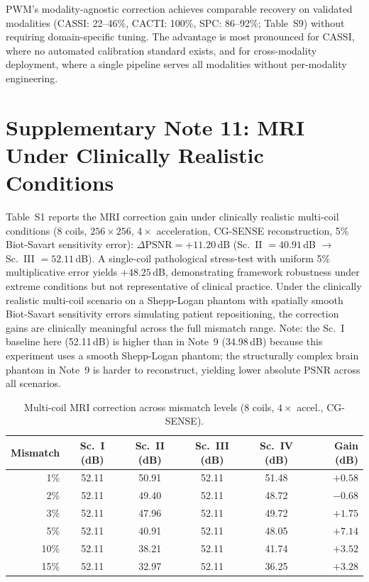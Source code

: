 \documentclass[11pt]{article}
\begin{document}
PWM's modality-agnostic correction achieves comparable recovery on validated modalities (CASSI: 22--46\%, CACTI: 100\%, SPC: 86--92\%; Table~S9) without requiring domain-specific tuning. The advantage is most pronounced for CASSI, where no automated calibration standard exists, and for cross-modality deployment, where a single pipeline serves all modalities without per-modality engineering.

\section{Supplementary Note 11: MRI Under Clinically Realistic Conditions}
\label{sec:mri_realistic}

Table~S1 reports the MRI correction gain under clinically realistic multi-coil conditions (8 coils, $256 \times 256$, $4\times$ acceleration, CG-SENSE reconstruction, 5\% Biot-Savart sensitivity error): $\Delta\mathrm{PSNR} = +11.20$\,dB (Sc.~II $= 40.91$\,dB $\to$ Sc.~III $= 52.11$\,dB). A single-coil pathological stress-test with uniform 5\% multiplicative error yields $+48.25$\,dB, demonstrating framework robustness under extreme conditions but not representative of clinical practice. Under the clinically realistic multi-coil scenario on a Shepp-Logan phantom with spatially smooth Biot-Savart sensitivity errors simulating patient repositioning, the correction gains are clinically meaningful across the full mismatch range.  Note: the Sc.~I baseline here (52.11\,dB) is higher than in Note~9 (34.98\,dB) because this experiment uses a smooth Shepp-Logan phantom; the structurally complex brain phantom in Note~9 is harder to reconstruct, yielding lower absolute PSNR across all scenarios.

\begin{table}[ht]
\centering\small
\caption{Multi-coil MRI correction across mismatch levels (8 coils, $4\times$ accel., CG-SENSE).}
\label{tab:mri_realistic}
\begin{tabular}{@{}rccccr@{}}
\toprule
Mismatch & Sc.~I (dB) & Sc.~II (dB) & Sc.~III (dB) & Sc.~IV (dB) & Gain (dB) \\
\midrule
1\%  & 52.11 & 50.91 & 52.11 & 51.48 & $+0.58$ \\
2\%  & 52.11 & 49.40 & 52.11 & 48.72 & $-0.68$ \\
3\%  & 52.11 & 47.96 & 52.11 & 49.72 & $+1.75$ \\
5\%  & 52.11 & 40.91 & 52.11 & 48.05 & $+7.14$ \\
10\% & 52.11 & 38.21 & 52.11 & 41.74 & $+3.52$ \\
15\% & 52.11 & 32.97 & 52.11 & 36.25 & $+3.28$ \\
\bottomrule
\end{tabular}
\end{table}
\end{document}
